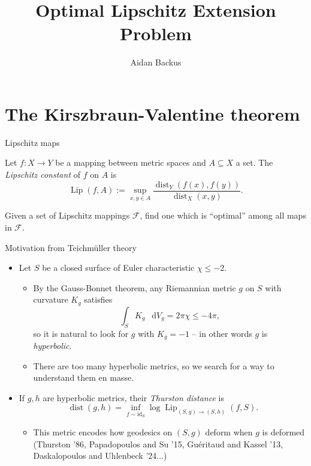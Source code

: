 \documentclass[10pt]{beamer}
\title{Optimal Lipschitz Extension Problem}
\author{Aidan Backus}
\newcommand*\dif{\mathop{}\!\mathrm{d}}
\DeclareMathOperator{\dist}{dist}
\DeclareMathOperator{\Lip}{Lip}
\newcommand{\id}{\mathrm{id}}
\begin{document}
\frame{\titlepage}

\section{The Kirszbraun-Valentine theorem}

\begin{frame}{Lipschitz maps}
\begin{definition}
Let $f: X \to Y$ be a mapping between metric spaces and $A \subseteq X$ a set.
The \emph{Lipschitz constant} of $f$ on $A$ is
$$\Lip(f, A) := \sup_{x, y \in A} \frac{\dist_Y(f(x), f(y))}{\dist_X(x, y)}.$$
\end{definition}

\pause
 
\begin{problem}
Given a set of Lipschitz mappings $\mathscr F$, find one which is ``optimal'' among all maps in $\mathscr F$.
\end{problem}
\end{frame}

\begin{frame}{Motivation from Teichm\"uller theory}
\begin{itemize}
\item Let $S$ be a closed surface of Euler characteristic $\chi \leq -2$.
\begin{itemize}
\item By the Gauss-Bonnet theorem, any Riemannian metric $g$ on $S$ with curvature $K_g$ satisfies 
$$\int_S K_g ~\dif V_g = 2\pi \chi \leq -4\pi,$$
so it is natural to look for $g$ with $K_g = -1$ -- in other words $g$ is \emph{hyperbolic}.
\item There are too many hyperbolic metrics, so we search for a way to understand them en masse. \pause
\end{itemize}
\item If $g, h$ are hyperbolic metrics, their \emph{Thurston distance} is
$$\dist(g, h) = \inf_{f \sim \id_S} \log \Lip_{(S, g) \to (S, h)}(f, S).$$
\begin{itemize}
\item This metric encodes how geodesics on $(S, g)$ deform when $g$ is deformed (Thurston '86, Papadopoulos and Su '15, Gu\'eritaud and Kassel '13, Daskalopoulos and Uhlenbeck '24...) 
\end{itemize}
\end{itemize}
\end{frame}
\end{document}

